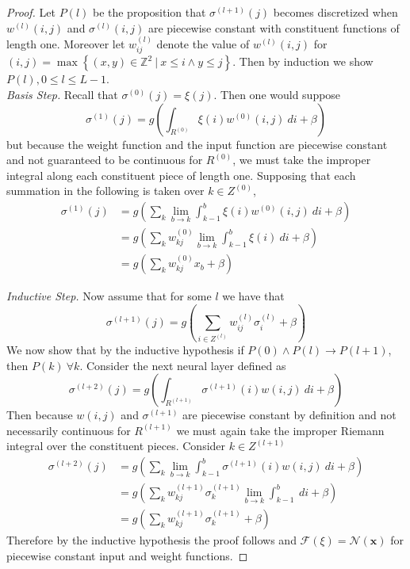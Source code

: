 \begin{proof}
Let $P(l)$ be the proposition that $\sigma^{(l+1)}(j)$ becomes discretized when $w^{(l)}(i,j)$ and $\sigma^{(l)}(i,j)$ are piecewise constant with constituent functions of length one. Moreover let $w_{ij}^{(l)}$ denote the value of $w^{(l)}(i,j)$ for $(i,j) = \max\left\{(x,y) \in \mathbb{Z}^2\ |\ x\leq i \wedge y \leq j\right\}$. Then by induction we show $P(l), 0 \leq l \leq L-1$. \\


\textit{Basis Step.} Recall that $\sigma^{(0)}(j) = \xi(j)$. Then one would suppose
\begin{equation}\sigma^{(1)}(j) = g\left(\int_{R^{(0)}} \xi(i) w^{(0)}(i,j)\ di + \beta\right)\end{equation}
but because the weight function and the input function are piecewise constant and not guaranteed to be continuous for $R^{(0)}$, we must take the improper integral along each constituent piece of length one. Supposing that each summation in the following is taken over $k\in Z^{(0)}$,
\begin{equation}
\begin{aligned}
    \sigma^{(1)}(j) &= g\left(\sum_{k}\lim_{b\to k}\int_{k-1}^b\xi(i) w^{(0)}(i,j)\ di + \beta\right) \\
    &= g\left(\sum_{k}w^{(0)}_{kj}\lim_{b\to k}\int_{k-1}^b\xi(i)\ di + \beta\right) \\
        &= g\left(\sum_{k}w_{kj}^{(0)}x_b + \beta\right)
 \end{aligned}
 \end{equation}
 
 
\textit{Inductive Step.} Now assume that for some $l$ we have that
\begin{equation}\sigma^{(l+1)}(j) = g\left(\sum_{i\in Z^{(l)}}w_{ij}^{(l)}\sigma_i^{(l)} + \beta \right)\end{equation}
We now show that by the inductive hypothesis if $P(0) \wedge P(l) \to P(l+1)$, then $P(k)\  \forall k$. Consider the next neural layer defined as
\begin{equation}\sigma^{(l+2)}(j) = g\left(\int_{R^{(l+1)}}\sigma^{(l+1)}(i) w(i,j)\ di + \beta\right)\end{equation}
Then because $w(i,j)$ and $\sigma^{(l+1)}$ are piecewise constant by definition and not necessarily continuous for $R^{(l+1)}$ we must again take the improper Riemann integral over the constituent pieces. Consider $k\in Z^{(l+1)}$
\begin{equation}
    \begin{aligned}
        \sigma^{(l+2)}(j) &= g\left(\sum_{k}\lim_{b\to k}\int_{k-1}^b\sigma^{(l+1)}(i) w(i,j)\ di + \beta\right) \\
                                          &= g\left(\sum_{k}w_{kj}^{(l+1)}\sigma_k^{(l+1)}\lim_{b\to k}\int_{k-1}^b\ di + \beta\right) \\
                                          &= g\left(\sum_{k}w_{kj}^{(l+1)}\sigma_k^{(l+1)} + \beta\right)
    \end{aligned}
\end{equation}
Therefore by the inductive hypothesis the proof follows and $\mathcal{F}(\xi) = \mathcal{N}(\pmb{x})$ for piecewise constant input and weight functions.


\end{proof}

